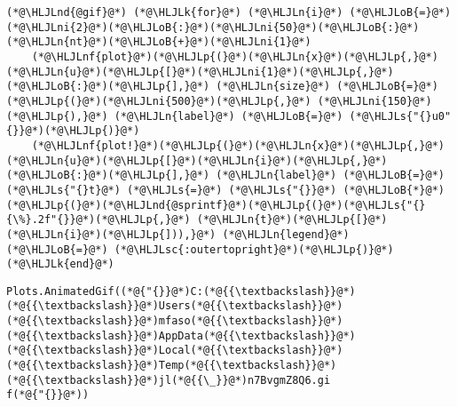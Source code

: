 \documentclass[12pt,landscape]{article}
\newcommand{\HLJLk}[1]{\textcolor[RGB]{148,91,176}{\textbf{#1}}}
\newcommand{\HLJLn}[1]{#1}
\newcommand{\HLJLnd}[1]{\textcolor[RGB]{214,102,97}{#1}}
\newcommand{\HLJLnf}[1]{\textcolor[RGB]{66,102,213}{#1}}
\newcommand{\HLJLs}[1]{\textcolor[RGB]{201,61,57}{#1}}
\newcommand{\HLJLsc}[1]{\textcolor[RGB]{201,61,57}{#1}}
\newcommand{\HLJLni}[1]{\textcolor[RGB]{59,151,46}{#1}}
\newcommand{\HLJLoB}[1]{\textcolor[RGB]{102,102,102}{\textbf{#1}}}
\newcommand{\HLJLp}[1]{#1}
\begin{document}
{\begin{lstlisting}
(*@\HLJLnd{@gif}@*) (*@\HLJLk{for}@*) (*@\HLJLn{i}@*) (*@\HLJLoB{=}@*) (*@\HLJLni{2}@*)(*@\HLJLoB{:}@*)(*@\HLJLni{50}@*)(*@\HLJLoB{:}@*)(*@\HLJLn{nt}@*)(*@\HLJLoB{+}@*)(*@\HLJLni{1}@*) 
    (*@\HLJLnf{plot}@*)(*@\HLJLp{(}@*)(*@\HLJLn{x}@*)(*@\HLJLp{,}@*) (*@\HLJLn{u}@*)(*@\HLJLp{[}@*)(*@\HLJLni{1}@*)(*@\HLJLp{,}@*)(*@\HLJLoB{:}@*)(*@\HLJLp{],}@*) (*@\HLJLn{size}@*) (*@\HLJLoB{=}@*) (*@\HLJLp{(}@*)(*@\HLJLni{500}@*)(*@\HLJLp{,}@*) (*@\HLJLni{150}@*)(*@\HLJLp{),}@*) (*@\HLJLn{label}@*) (*@\HLJLoB{=}@*) (*@\HLJLs{"{}u0"{}}@*)(*@\HLJLp{)}@*)
    (*@\HLJLnf{plot!}@*)(*@\HLJLp{(}@*)(*@\HLJLn{x}@*)(*@\HLJLp{,}@*) (*@\HLJLn{u}@*)(*@\HLJLp{[}@*)(*@\HLJLn{i}@*)(*@\HLJLp{,}@*)(*@\HLJLoB{:}@*)(*@\HLJLp{],}@*) (*@\HLJLn{label}@*) (*@\HLJLoB{=}@*) (*@\HLJLs{"{}t}@*) (*@\HLJLs{=}@*) (*@\HLJLs{"{}}@*) (*@\HLJLoB{*}@*) (*@\HLJLp{(}@*)(*@\HLJLnd{@sprintf}@*)(*@\HLJLp{(}@*)(*@\HLJLs{"{}{\%}.2f"{}}@*)(*@\HLJLp{,}@*) (*@\HLJLn{t}@*)(*@\HLJLp{[}@*)(*@\HLJLn{i}@*)(*@\HLJLp{])),}@*) (*@\HLJLn{legend}@*) (*@\HLJLoB{=}@*) (*@\HLJLsc{:outertopright}@*)(*@\HLJLp{)}@*)
(*@\HLJLk{end}@*)
\end{lstlisting}

\begin{lstlisting}
Plots.AnimatedGif((*@{"{}}@*)C:(*@{{\textbackslash}}@*)(*@{{\textbackslash}}@*)Users(*@{{\textbackslash}}@*)(*@{{\textbackslash}}@*)mfaso(*@{{\textbackslash}}@*)(*@{{\textbackslash}}@*)AppData(*@{{\textbackslash}}@*)(*@{{\textbackslash}}@*)Local(*@{{\textbackslash}}@*)(*@{{\textbackslash}}@*)Temp(*@{{\textbackslash}}@*)(*@{{\textbackslash}}@*)jl(*@{{\_}}@*)n7BvgmZ8Q6.gi
f(*@{"{}}@*))
\end{lstlisting}


}
\end{document}
